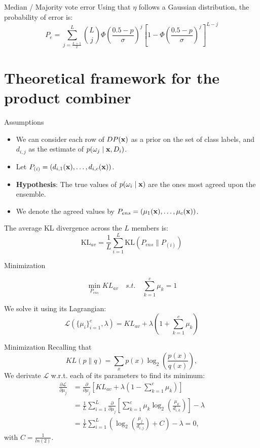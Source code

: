 \documentclass[xcolor=table]{beamer}
\begin{document}
\begin{frame}{Median / Majority vote error}
    Using that \(\eta\) follows a Gaussian distribution, the probability of error is:
    \[
    P_e =  \sum_{j = \frac{L+1}{2}}^L \binom{L}{j} \Phi\left(\frac{0.5-p}{\sigma}\right)^j \left[1-\Phi\left(\frac{0.5-p}{\sigma}\right)^j\right]^{L-j}
    \]
\end{frame}

\section{Theoretical framework for the product combiner}

\begin{frame}{Assumptions}
    \begin{itemize}
        \item We can consider each row of \(DP({\mathbf x})\) as a prior on the set of class labels, and \(d_{i,j}\) as the estimate of \(p(\omega_j \mid {\mathbf x}, D_i)\).
        \item Let \(P_{(i)} = (d_{i,1}({\mathbf x}),\dots,d_{i,c}({\mathbf x}))\).
        \pause
        \item \textbf{Hypothesis}: The true values of \(p(\omega_i \mid {\mathbf x})\) are the ones most agreed upon the ensemble. 
        \item We denote the agreed values by \(P_{ens} = (\mu_1({\mathbf x}), \dots,\mu_c({\mathbf x}))\).
    \end{itemize}
    \pause
    The average KL divergence across the \(L\) members is:
    \[
    \text{KL}_{av} = \frac{1}{L} \sum_{i=1}^L \text{KL}(P_{ens} \parallel P_{(i)})
    \]
\end{frame}

\begin{frame}{Minimization}
    \begin{problem}
    \[
    \min_{P_{ens}} KL_{av}\quad s.t. \quad \sum_{k=1}^c \mu_k = 1
    \]
    \end{problem}
    \pause
    We solve it using its Lagrangian:
    \\
    \[
    \mathcal L (\{\mu_i\}_{i=1}^c, \lambda) = KL_{av} + \lambda \left(1 + \sum_{k=1}^c \mu_k\right)
    \]
    
\end{frame}

\begin{frame}{Minimization}
Recalling that 
\[
KL(p \parallel q) = \sum_{x}p(x) \log_2 \left(\frac{p(x)}{q(x)}\right),
\]
\pause
We derivate \(\mathcal L\) w.r.t. each of its parameters to find its minimum:
\begin{align*}
\frac{\partial \mathcal L}{\partial \mu_j} & = \frac{\partial}{\partial \mu_j} \left[ KL_{av} + \lambda \left(1 - \sum_{k=1}^c \mu_k\right)\right]\\
& = \frac{1}{L} \sum_{i=1}^L \frac{\partial}{\partial \mu_j} \left[\sum_{k=1}^c\mu_k \log_2 \left(\frac{\mu_k}{d_{i,k}}\right)\right] - \lambda\\
& = \frac{1}{L} \sum_{i=1}^L \left(\log_2 \left(\frac{\mu_j}{d_{i,j}}\right) + C\right) - \lambda = 0,
\end{align*}
with \(C = \frac{1}{ln(2)}\).
\end{frame}
\end{document}

